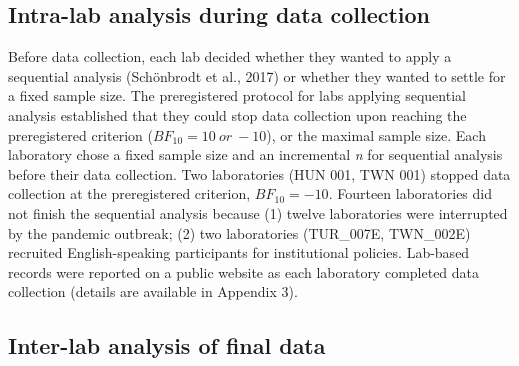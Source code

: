 \documentclass[
  man,floatsintext]{apa6}
\begin{document}
\hypertarget{intra-lab-analysis-during-data-collection}{%
\subsection{Intra-lab analysis during data collection}\label{intra-lab-analysis-during-data-collection}}

Before data collection, each lab decided whether they wanted to apply a sequential analysis (Schönbrodt et al., 2017) or whether they wanted to settle for a fixed sample size. The preregistered protocol for labs applying sequential analysis established that they could stop data collection upon reaching the preregistered criterion (\(BF_{10} = 10\ or\ -10\)), or the maximal sample size. Each laboratory chose a fixed sample size and an incremental \emph{n} for sequential analysis before their data collection. Two laboratories (HUN 001, TWN 001) stopped data collection at the preregistered criterion, \(BF_{10} = -10\). Fourteen laboratories did not finish the sequential analysis because (1) twelve laboratories were interrupted by the pandemic outbreak; (2) two laboratories (TUR\_007E, TWN\_002E) recruited English-speaking participants for institutional policies. Lab-based records were reported on a public website as each laboratory completed data collection (details are available in Appendix 3).

\hypertarget{inter-lab-analysis-of-final-data}{%
\subsection{Inter-lab analysis of final data}\label{inter-lab-analysis-of-final-data}}
\end{document}
